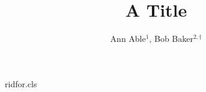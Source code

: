 \begin{filecontents*}[overwrite]{ridfor.cls}
\renewcommand{\author}[1]{{\raggedright #1\par}}
\newcommand{\affil}[1]{{\small\raggedright #1}}
\end{filecontents*}
\documentclass{ridfor}

\title{A Title}
\author{Ann Able$^{1}$, Bob Baker$^{2,\dagger}$}




\maketitle
Text.

